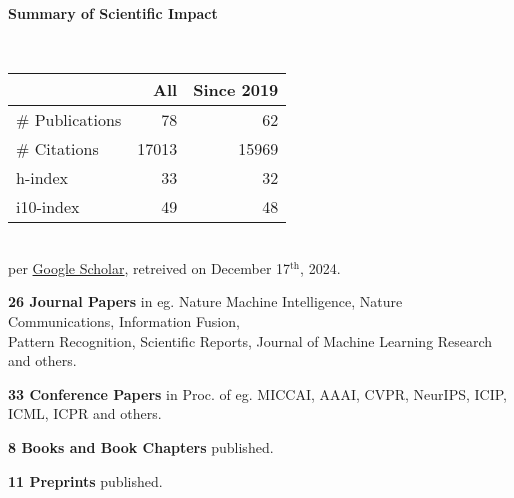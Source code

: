 \headedsection %
{\bf Summary of Scientific Impact}{}{}
{
    \qquad~~~~
    \begin{minipage}[t]{0.6\textwidth}
        \begin{tabular}{lrr}
        \hline
         & All & Since 2019\\
        \hline
        \# Publications & 78     & 62    \\
        \# Citations    & 17013  & 15969 \\
        h-index         & 33     & 32    \\
        i10-index       & 49     & 48    \\
        \hline
    \end{tabular}
    \\
    {\footnotesize{
        per \href{https://scholar.google.com/citations?user=wpLQuroAAAAJ}{Google Scholar},
        retreived on December 17$^\text{th}$, 2024.
        }
    }
    \end{minipage}

    \ifdefined\shortcv
        \vstep
        {\bf 26 Journal Papers} in eg. Nature Machine Intelligence, Nature Communications, Information Fusion,\\
        \hspace*{\fill} Pattern Recognition, Scientific Reports, Journal of Machine Learning Research and others.

        {\bf 33 Conference Papers} in Proc. of eg. MICCAI, AAAI, CVPR, NeurIPS, ICIP, ICML, ICPR and others.

        {\bf 8 Books and Book Chapters} published.

        {\bf 11 Preprints} published.
        
    \else
        {}
    \fi

}
